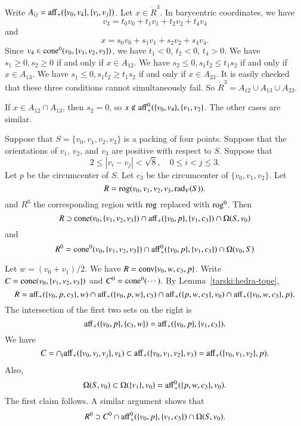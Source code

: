 \begin{tarskidata}
\begin{tarski}
\begin{proved} Write $A_{ij} = {\operatorname{aff}}_+(\{v_0,v_4\},\{v_i,v_j\})$.
  Let $x\in\ring{R}^3$.  In barycentric coordinates, we have
  $$
  v_3 = t_0 v_0 + t_1 v_1 + t_2 v_2 + t_4 v_4
  $$
and
$$
  x = s_0 v_0 + s_1 v_1 + s_2 v_2 + s_4 v_4.
$$
Since $v_4\in{\operatorname{cone}}^0(v_0,\{v_1,v_2,v_3\})$, we have
$t_1<0$, $t_2<0$, $t_4>0$.  
We have $s_1\ge0,s_2\ge0$ if and only if $x\in A_{12}$.
We have $s_2\le0,s_1t_2\le t_1s_2$ if and only if $x\in A_{13}$.
We have $s_1\le0,s_1t_2\ge t_1s_2$ if and only if $x\in A_{23}$.
It is easily checked that these three conditions cannot simultaneously
fail.  So $\ring{R}^3 = A_{12}\cup A_{13}\cup A_{23}$.

If $x\in A_{12}\cap A_{13}$, then $s_2=0$, so $x\not\in{\operatorname{aff}}_+^0(\{v_0,v_4\},\{v_1,v_2\}$.  The other cases are similar.
\swallowed\end{proved}
\end{tarski}





\begin{tarski}

\begin{lemma}
Suppose that $S=\{v_0,v_1,v_2,v_3\}$ is a packing
of four points.  Suppose that 
the orientations of $v_1$, $v_2$, and $v_3$ are positive with respect
to $S$.  Suppose that 
  $$
  2 \le |v_i - v_j | < \sqrt8, \quad 0\le i < j \le 3.
  $$
Let $p$ be the circumcenter of $S$.  Let $c_3$
be the circumcenter of $\{v_0,v_1,v_2\}$.
Let 
   $$
   R = {\operatorname{rog}}(v_0,v_1,v_2,v_3,\operatorname{rad}_V(S)).
   $$
and $R^0$ the corresponding region with ${\operatorname{rog}}$ replaced
with ${\operatorname{rog}}^0$.
Then 
$$
 R \supset {\operatorname{cone}}(v_0,\{v_1,v_2,v_3\})\cap
  {\operatorname{aff}}_+(\{v_0,p\},\{v_1,c_3\}) \cap
  \Omega(S,v_0)
$$ 
and 
$$
 R^0 = {\operatorname{cone}}^0(v_0,\{v_1,v_2,v_3\})\cap
  {\operatorname{aff}}^0_+(\{v_0,p\},\{v_1,c_3\}) \cap
  \Omega(v_0,S)
$$ 
\end{lemma}

\begin{proved}
Let $w=(v_0+v_1)/2$.  We have $R={\operatorname{conv}}\{v_0,w,c_3,p\}$.
Write $C = {\operatorname{cone}}(v_0,\{v_1,v_2,v_3\})$ and $C^0 = {\operatorname{cone}}^0(\cdots)$.
By Lemma~\ref{tarski:hedra-tope}, 
   $$
   R={\operatorname{aff}}_+(\{v_0,p,c_3\},w)\cap {\operatorname{aff}}_+(\{v_0,p,w\},c_3)\cap
   {\operatorname{aff}}_+(\{p,w,c_3\},v_0)\cap {\operatorname{aff}}_+(\{v_0,w,c_3\},p).
   $$
The intersection of the first two sets on the right is
$$
   {\operatorname{aff}}_+(\{v_0,p\},\{c_3,w\}) = {\operatorname{aff}}_+(\{v_0,p\},\{v_1,c_3\}).
$$
We have
$$
C = \cap_i {\operatorname{aff}}_+(\{v_0,v_i,v_j\},v_k)
  \subset {\operatorname{aff}}_+(\{v_0,v_1,v_2\},v_3) = {\operatorname{aff}}_+(\{v_0,v_1,v_2\},p).
$$
Also,
$$
\Omega(S,v_0)\subset \Omega(\{v_1\},v_0) = {\operatorname{aff}}_+^0(\{p,w,c_3\},v_0).
$$
The first claim follows.
A similar argument shows that
$$
 R^0 \supset C^0\cap
  {\operatorname{aff}}_+^0(\{v_0,p\},\{v_1,c_3\}) \cap
  \Omega(S,v_0).
$$ 


\end{proved}
\end{tarski}
\end{tarskidata}
